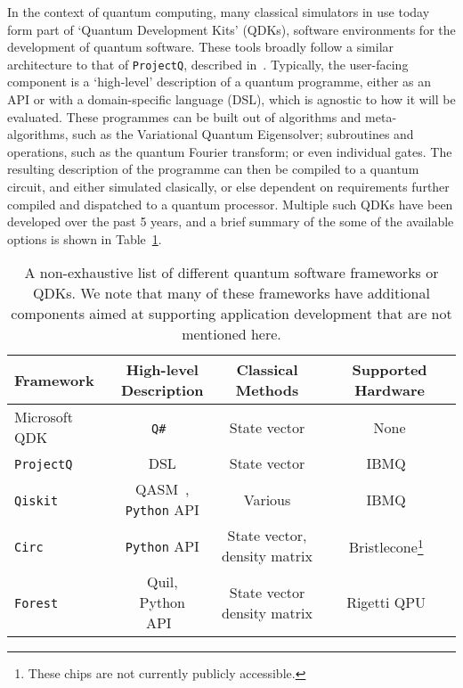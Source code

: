 In the context of quantum computing, many classical simulators in use today form part of `Quantum Development Kits' (QDKs), software environments for the development of quantum software. These tools broadly follow a similar architecture to that of \texttt{ProjectQ}, described in~\cite{Haner2018}. Typically, the user-facing component is a `high-level' description of a quantum programme, either as an API or with a domain-specific language (DSL), which is agnostic to how it will be evaluated. These programmes can be built out of algorithms and meta-algorithms, such as the Variational Quantum Eigensolver; subroutines and operations, such as the quantum Fourier transform; or even individual gates. The resulting description of the programme can then be compiled to a quantum circuit, and either simulated clasically, or else dependent on requirements further compiled and dispatched to a quantum processor. Multiple such QDKs have been developed over the past 5 years, and a brief summary of the some of the available options is shown in Table~\ref{tab:qdks}.
\begin{table}[H]
\begin{tabular}{|l|c|c|c|}
\toprule
Framework & \makecell{High-level\\Description} & Classical Methods & Supported Hardware \\ \midrule
Microsoft QDK~\cite{MicrosoftQDK} & \texttt{Q\#}~\cite{Svore2018} & State vector & None \\
\texttt{ProjectQ}~\cite{Steiger2016} & DSL & State vector & IBMQ~\cite{IBMQ} \\
\texttt{Qiskit}~\cite{Qiskit} & \makecell{QASM~\cite{Cross2017},\\ \texttt{Python} API} & Various & IBMQ~\cite{IBMQ}\\
\texttt{Circ}~\cite{GoogleCirc} & \texttt{Python} API & \makecell{State vector,\\density matrix} & Bristlecone\footnote{These chips are not currently publicly accessible.}~\cite{CircAnnouncement}\\
\texttt{Forest}~\cite{RigettiForest} & \makecell{Quil,\\ Python API~\cite{Smith2016}} & \makecell{State vector \\ density matrix} & Rigetti QPU~\cite{RigettiQPU}\\ \bottomrule
\end{tabular}
\caption{A non-exhaustive list of different quantum software frameworks or QDKs. We note that many of these frameworks have additional components aimed at supporting application development that are not mentioned here.}
\label{tab:qdks}
\end{table}
